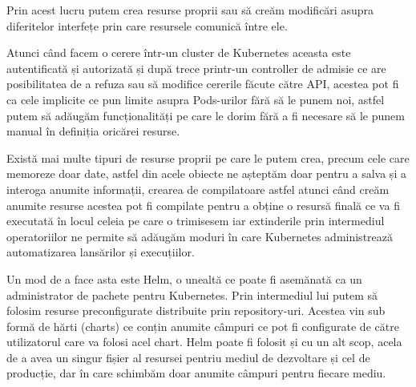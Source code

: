 Prin acest lucru putem crea resurse proprii sau să creăm modificări asupra diferitelor 
interfețe prin care resursele comunică între ele.

Atunci când facem o cerere într-un cluster de Kubernetes aceasta este autentificată și autorizată 
și după trece printr-un controller de admisie ce are posibilitatea de a refuza sau să modifice
cererile făcute către API, acestea pot fi ca cele implicite ce pun limite asupra Pods-urilor
fără să le punem noi, astfel putem să adăugăm funcționalități pe care le dorim fără 
a fi necesare să le punem manual în definiția oricărei resurse.

Există mai multe tipuri de resurse proprii pe care le putem crea, precum cele care 
memoreze doar date, astfel din acele obiecte ne așteptăm doar pentru a salva și a interoga anumite
informații, crearea de compilatoare astfel atunci când creăm anumite resurse acestea pot fi compilate 
pentru a obține o resursă finală ce va fi executată în locul celeia pe care o trimisesem iar 
extinderile prin intermediul operatoriilor ne permite să adăugăm moduri în care Kubernetes 
administrează automatizarea lansărilor și execuțiilor.

Un mod de a face asta este Helm, o unealtă ce poate fi asemănată ca un administrator
de pachete pentru Kubernetes. Prin intermediul lui putem să folosim resurse preconfigurate
distribuite prin repository-uri. Acestea vin sub formă de hărti (charts) ce conțin
anumite câmpuri ce pot fi configurate de către utilizatorul care va folosi acel chart.
Helm poate fi folosit și cu un alt scop, acela de a avea un singur fișier al resursei
pentriu mediul de dezvoltare și cel de producție, dar în care schimbăm doar anumite
câmpuri pentru fiecare mediu.
